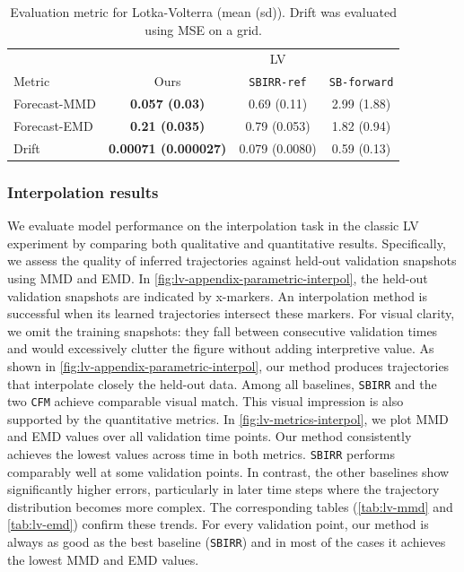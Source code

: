 \begin{table}[ht!]
    \centering
    \caption{Evaluation metric for Lotka-Volterra (mean (sd)). Drift was evaluated using MSE on a grid.}
    \begin{tabular}{lccc}
    \hline
           &          &   LV  &   \\
    Metric     &  Ours & \texttt{SBIRR-ref} & \texttt{SB-forward} \\
    \hline
    Forecast-MMD & \cellcolor{green!25}\textbf{0.057 (0.03)} & 0.69 (0.11)& 2.99 (1.88)  \\
    Forecast-EMD & \cellcolor{green!25}\textbf{0.21 (0.035)} & 0.79 (0.053)& 1.82 (0.94)  \\
    Drift & \cellcolor{green!25}\textbf{0.00071 (0.000027)} & 0.079 (0.0080)& 0.59 (0.13)   \\
    \hline
    \end{tabular}
    \label{tab:lv}
\end{table}

\subsubsection{Interpolation results}
\label{app:lv-interpol}
We evaluate model performance on the interpolation task in the classic LV experiment by comparing both qualitative and quantitative results. Specifically, we assess the quality of inferred trajectories against held-out validation snapshots using MMD and EMD. In \cref{fig:lv-appendix-parametric-interpol}, the held-out validation snapshots are indicated by x-markers. An interpolation method is successful when its learned trajectories intersect these markers. For visual clarity, we omit the training snapshots: they fall between consecutive validation times and would excessively clutter the figure without adding interpretive value. As shown in \cref{fig:lv-appendix-parametric-interpol}, our method produces trajectories that interpolate closely the held-out data. Among all baselines, \texttt{SBIRR} and the two \texttt{CFM} achieve comparable visual match. This visual impression is also supported by the quantitative metrics. In \cref{fig:lv-metrics-interpol}, we plot MMD and EMD values over all validation time points. Our method consistently achieves the lowest values across time in both metrics. \texttt{SBIRR} performs comparably well at some validation points. In contrast, the other baselines show significantly higher errors, particularly in later time steps where the trajectory distribution becomes more complex. The corresponding tables (\cref{tab:lv-mmd} and \cref{tab:lv-emd}) confirm these trends. For every validation point, our method is always as good as the best baseline (\texttt{SBIRR}) and in most of the cases it achieves the lowest MMD and EMD values. 


